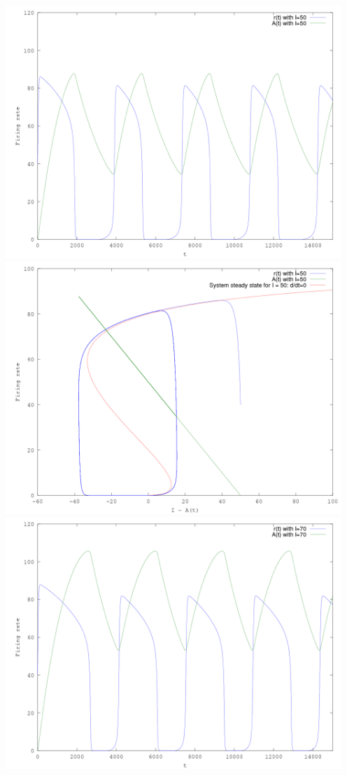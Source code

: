 \documentclass[11pt]{article}
\begin{document}
\includegraphics[width=5in]{4tb.png}\\
\includegraphics[width=5in]{4pb.png}\\
\includegraphics[width=5in]{4tc.png}\\
\end{document}
